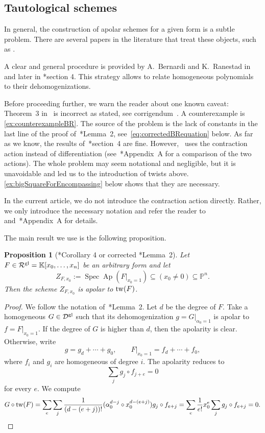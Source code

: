 \documentclass[a4paper,11pt,reqno]{amsart}
\newcommand{\calD}{\mathcal{D}}
\newcommand{\calR}{\mathcal{R}}
\newcommand{\bbK}{\mathbb{K}}
\DeclareMathOperator{\Ap}{Ap}
\DeclareMathOperator{\Spec}{Spec}
\numberwithin{equation}{section}
\theoremstyle{definition}
\theoremstyle{plain}
\newtheorem{prop}[defn]{Proposition}
\theoremstyle{remark}
\newcommand{\calDgl}{\calD^{\rm{gl}}}
\newcommand{\calRgl}{\calR^{\rm{gl}}}
\begin{document}
\subsection{Tautological schemes}\label{ssec:tautological}
\noindent In general, the construction of apolar schemes for a given form is a subtle problem.
There are several papers in the literature that treat these objects, such as
\cites{BB14,Chi06,GRV18,RS11}.

A clear and general procedure is provided by A.~Bernardi and K.~Ranestad
in~\cite{BR13} and later in \cite{BJMR18}*{section 4}. This strategy allows to relate homogeneous polynomials to their dehomogenizations.

Before proceeding further, we warn the reader about one known caveat: Theorem~3
in~\cite{BR13} is {incorrect} as stated, see corrigendum~\cite{BR24}. A counterexample is \autoref{ex:counterexampleBR}.
The source of the problem is the {lack} of constants in the last line of the proof of~\cite{BR13}*{Lemma~2},
see~\eqref{eq:correctedBRequation} below. As far
as we know, the results of~\cite{BJMR18}*{section~4} are fine.
However,~\cite{BJMR18} uses
the contraction action instead of differentiation
(see~\cite{IK99}*{Appendix~A} for a comparison of the two actions). The whole
problem may seem notational and negligible, but it is unavoidable and led us
to the introduction of twists above.
\autoref{ex:bigSquareForEncompassing} below shows that they are
necessary.

In the current article, we do not introduce the contraction action directly.
Rather, we only introduce the necessary notation and refer the reader
to~\cite{BJMR18} and~\cite{IK99}*{Appendix~A} for details.

The main result we use is the following proposition.
\begin{prop}[\cite{BJMR18}*{Corollary 4} or corrected \cite{BR13}*{Lemma~2}]
\label{prop:BJMR18_Corollary_4}
Let $F\in\calRgl = \bbK[x_0, \ldots ,x_n]$ be an arbitrary form and let
\[
    Z_{F,x_0} := \Spec \Ap(F|_{x_0=1}) \subseteq (x_0\neq 0) \subseteq \mathbb{P}^n.
\]
Then the
scheme $Z_{F,x_0}$ is apolar
to $\mathrm{tw}(F)$.
\end{prop}
\begin{proof}
    We follow the notation of~\cite{BR13}*{Lemma~2}.
    Let $d$ be the degree of $F$. Take a homogeneous
        $G\in\calDgl$ such
    that its dehomogenization $g = G|_{\alpha_0=1}$ is apolar to $f=F|_{x_0=1}$.
    If the degree of $G$ is higher than $d$, then
the apolarity is clear. Otherwise,
    write \[ g = g_d + \cdots + g_0,\qquad F|_{x_0 = 1} = f_d + \cdots +
    f_0,\] where $f_i$ and $g_i$ are homogeneous of degree $i$. The apolarity reduces to \[\sum_j g_j\circ f_{j+e} = 0\] for every $e$.    We compute
    \begin{equation}\label{eq:correctedBRequation}
        G\circ \mathrm{tw}(F) = \sum_{e}\sum_j \frac{1}{(d-(e+j))!}(\alpha_0^{d-j} \circ
        x_0^{d-(e+j)}) g_j\circ f_{e+j} = \sum_e \frac{1}{e!} x_0^e \sum_j
        g_j\circ f_{e+j} = 0.\qedhere
    \end{equation}
\end{proof}
\end{document}
